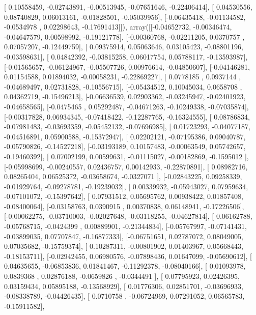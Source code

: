 \documentclass{article}
\begin{document}
       [ 0.10558459, -0.02743891, -0.00513945, -0.07651646, -0.22406414],
       [ 0.04530556,  0.08740829,  0.06013161, -0.01828501, -0.05039956],
       [-0.06435418, -0.01134582, -0.0534978 ,  0.02298643, -0.17691413]]), array([[-0.04652732, -0.00346474, -0.04647579,  0.00598992, -0.19121778],
       [-0.00360768, -0.02211205,  0.0370757 ,  0.07057207, -0.12449759],
       [ 0.09375914,  0.05063646,  0.03105423, -0.08801196, -0.03598631],
       [ 0.04842392, -0.03815258,  0.06017754,  0.05788117, -0.13593987],
       [-0.01565657, -0.06124967, -0.05507726,  0.00976614, -0.04850607],
       [-0.04146281,  0.01154588,  0.01894032, -0.00058231, -0.22869227],
       [ 0.0778185 ,  0.0937144 , -0.04689497,  0.02731828, -0.10556715],
       [-0.05434512,  0.10045034,  0.0658708 ,  0.04362719, -0.15496213],
       [-0.06636539,  0.02903362, -0.03245947, -0.02401923, -0.04658565],
       [-0.0475465 ,  0.05292487, -0.04671263, -0.10249338, -0.07035874],
       [-0.00317828,  0.06934345, -0.07418422, -0.12287765, -0.16324555],
       [ 0.08786834, -0.07981483, -0.03693359, -0.05452132, -0.07696985],
       [ 0.01723293, -0.04077187, -0.04516891,  0.05900588, -0.15372947],
       [ 0.02202121, -0.07195386,  0.09040787, -0.05790826, -0.14527218],
       [-0.03193189,  0.10157483, -0.00063549,  0.05742657, -0.19460392],
       [ 0.07002199,  0.00599631, -0.01115027, -0.00182869, -0.1595012 ],
       [-0.05998699, -0.00240557,  0.02436757,  0.00142933, -0.22870891],
       [ 0.08982716,  0.08265404,  0.06525372, -0.03658674, -0.0327071 ],
       [-0.02843225,  0.09258339, -0.01929764, -0.09278781, -0.19239032],
       [ 0.00339932, -0.05943027,  0.07959634, -0.07101072, -0.15397642],
       [ 0.07931512,  0.05695762,  0.00938422,  0.01857408, -0.08400064],
       [-0.03158763,  0.0390915 ,  0.00370838,  0.06148941, -0.17226506],
       [-0.00062275, -0.03710003, -0.02027648, -0.03118255, -0.04627814],
       [ 0.06162788, -0.05768715, -0.0424399 ,  0.00889901, -0.21344834],
       [-0.05767997, -0.07141431, -0.03899035,  0.07707847, -0.16877333],
       [-0.06751651,  0.02787072,  0.08049005,  0.07035682, -0.15759374],
       [ 0.10287311, -0.00801902,  0.01403967,  0.05668443, -0.18153711],
       [-0.02942455,  0.06980576, -0.07898436,  0.01647099, -0.05690612],
       [ 0.04635655, -0.06853836,  0.01841467, -0.11292378, -0.08040166],
       [ 0.01093978,  0.0839368 ,  0.02876188, -0.0659826 , -0.0344491 ],
       [ 0.07795923,  0.02426395,  0.03159434,  0.05895188, -0.13568929],
       [ 0.01776306,  0.02851701, -0.03696933, -0.08338789, -0.04426435],
       [ 0.0710758 , -0.06724969,  0.07291052,  0.06565783, -0.15911582],
\end{document}
